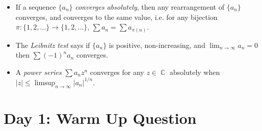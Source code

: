 \documentclass[answers]{exam}
\DeclareMathOperator{\CC}{\mathbb{C}}
\begin{document}
\begin{itemize}
	\item If a sequence $\{ a_n \}$ \emph{converges absolutely}, then any rearrangement of $\{ a_n \}$ converges, and converges to the same value, i.e. for any bijection $\pi: \{ 1, 2, \dots \} \to \{ 1, 2, \dots \}$, $\sum a_n = \sum a_{\pi(n)}$.

	\item The \emph{Leibnitz test} says if $\{ a_n \}$ is positive, non-increasing, and $\lim_{n \to \infty} a_n = 0$ then $\sum (-1)^n a_n$ converges.

	\item A \emph{power series} $\sum a_n z^n$ converges for any $z \in \CC$ absolutely when $|z| \leq \limsup_{n \to \infty} |a_n|^{1/n}$.
\end{itemize}

\newpage

\section{Day 1: Warm Up Question}
\end{document}
